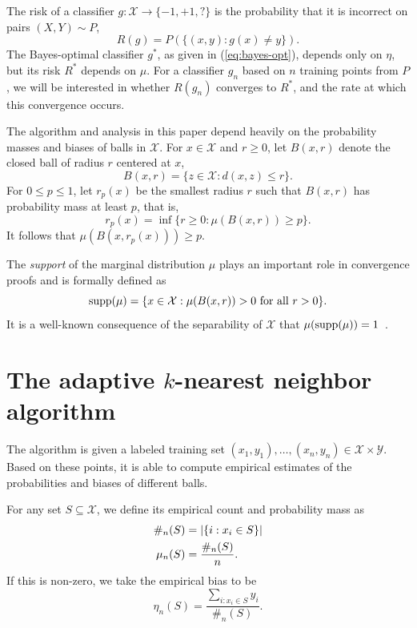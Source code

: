 \documentclass{article}
\def\X{{\mathcal X}}
\def\Y{{\mathcal Y}}
\def\supp{{\rm supp}}
\begin{document}
The risk of a classifier $g: \X \rightarrow \{-1,+1,?\}$ is the probability that it is incorrect on pairs $(X,Y) \sim P$,
\begin{equation}
R(g) = P(\{(x,y): g(x) \neq y\}).
\label{eq:risk}
\end{equation}
The Bayes-optimal classifier $g^*$, as given in (\ref{eq:bayes-opt}), depends only on $\eta$, but its risk $R^*$ depends on $\mu$. For a classifier $g_n$ based on $n$ training points from $P$, we will be interested in whether $R(g_n)$ converges to $R^*$, and the rate at which this convergence occurs.

The algorithm and analysis in this paper depend heavily on the probability masses and biases of balls in $\X$. For $x \in \X$ and $r \geq 0$, let $B(x,r)$ denote the closed ball of radius $r$ centered at $x$, 
$$ B(x,r) = \{ z \in \X : d(x,z) \leq r \} .$$
For $0 \leq p \leq 1$, let $r_p(x)$ be the smallest radius $r$ such that $B(x,r)$ has probability mass at least $p$, that is,
\begin{equation}
r_p(x) = \inf \{r \geq 0: \mu(B(x,r)) \geq p \}.
\label{eq:probability-radius}
\end{equation}
It follows that $\mu(B(x,r_p(x))) \geq p$.

The {\it support} of the marginal distribution $\mu$ plays an important role in convergence proofs and is formally defined as
$$ \supp(\mu) = \{x \in \X: \mbox{$\mu(B(x,r)) > 0$ for all $r > 0$}\} .$$
It is a well-known consequence of the separability of $\X$ that $\mu(\supp(\mu)) = 1$~\cite{CH67}.



\section{The adaptive $k$-nearest neighbor algorithm}\label{sec:alg}

The algorithm is given a labeled training set
$(x_1, y_1), \ldots, (x_n, y_n) \in \X \times \Y$.
Based on these points, it is able to compute empirical estimates of the probabilities and biases of different balls.

For any set $S \subseteq \X$, we define its empirical count and probability mass as
\begin{align}
\notag \#_n(S) &= |\{i: x_i \in S\}| \\
\mu_n(S) &= \frac{\#_n(S)}{n} .
\label{eq:empirical-mass}
\end{align}
If this is non-zero, we take the empirical bias to be
\begin{equation}
\eta_n(S) = \frac{\sum_{i: x_i \in S} y_i}{\#_n(S)} .
\label{eq:empirical-bias}
\end{equation}
\end{document}
